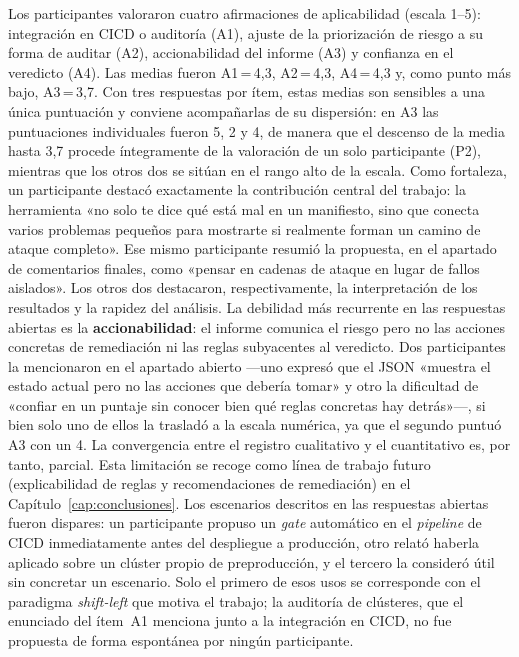 Los participantes valoraron cuatro afirmaciones de aplicabilidad (escala 1--5):
integración en \ac{CICD} o auditoría (A1), ajuste de la priorización de riesgo a su
forma de auditar (A2), accionabilidad del informe (A3) y confianza en el
veredicto (A4). Las medias fueron A1\,=\,4,3, A2\,=\,4,3, A4\,=\,4,3 y, como
punto más bajo, A3\,=\,3,7. Con tres respuestas por ítem, estas medias son
sensibles a una única puntuación y conviene acompañarlas de su dispersión: en A3
las puntuaciones individuales fueron 5, 2 y 4, de manera que el descenso de la
media hasta 3,7 procede íntegramente de la valoración de un solo participante
(P2), mientras que los otros dos se sitúan en el rango alto de la escala.
Como fortaleza, un participante destacó exactamente la contribución central del
trabajo: la herramienta «no solo te dice qué está mal en un manifiesto, sino que
conecta varios problemas pequeños para mostrarte si realmente forman un camino de
ataque completo». Ese mismo participante resumió la propuesta, en el apartado de
comentarios finales, como «pensar en cadenas de ataque en lugar de fallos
aislados». Los otros dos destacaron, respectivamente, la interpretación de los
resultados y la rapidez del análisis. La debilidad más recurrente en las respuestas abiertas es
la \textbf{accionabilidad}: el informe comunica el riesgo pero no las acciones
concretas de remediación ni las reglas subyacentes al veredicto. Dos
participantes la mencionaron en el apartado abierto —uno expresó que el
\ac{JSON} «muestra el estado actual pero no las acciones que debería tomar» y
otro la dificultad de «confiar en un puntaje sin conocer bien qué reglas
concretas hay detrás»\mbox{—,} si bien solo uno de ellos la trasladó a la escala
numérica, ya que el segundo puntuó A3 con un 4. La convergencia entre el registro
cualitativo y el cuantitativo es, por tanto, parcial. Esta limitación se recoge como
línea de trabajo futuro (explicabilidad de reglas y recomendaciones de
remediación) en el Capítulo~\ref{cap:conclusiones}. Los escenarios descritos en las
respuestas abiertas fueron dispares: un participante propuso un \textit{gate}
automático en el \textit{pipeline} de \ac{CICD} inmediatamente antes del despliegue
a producción, otro relató haberla aplicado sobre un clúster propio de
preproducción, y el tercero la consideró útil sin concretar un escenario. Solo el
primero de esos usos se corresponde con el paradigma \textit{shift-left} que motiva
el trabajo; la auditoría de clústeres, que el enunciado del ítem~A1 menciona junto
a la integración en \ac{CICD}, no fue propuesta de forma espontánea por ningún
participante.

